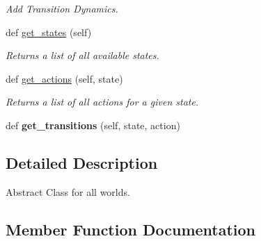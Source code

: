 \begin{DoxyCompactItemize}
\begin{DoxyCompactList}\small\item\em Add Transition Dynamics. \end{DoxyCompactList}\item 
\mbox{\label{classsrc_1_1worlds_1_1abstract__world_1_1_abstract_world_a1c5c774e258d31c703dc7a95280a686d}} 
def \hyperlink{classsrc_1_1worlds_1_1abstract__world_1_1_abstract_world_a1c5c774e258d31c703dc7a95280a686d}{get\+\_\+states} (self)
\begin{DoxyCompactList}\small\item\em Returns a list of all available states. \end{DoxyCompactList}\item 
def \hyperlink{classsrc_1_1worlds_1_1abstract__world_1_1_abstract_world_a177196a17a32460d8076eaffa643646b}{get\+\_\+actions} (self, state)
\begin{DoxyCompactList}\small\item\em Returns a list of all actions for a given state. \end{DoxyCompactList}\item 
\mbox{\label{classsrc_1_1worlds_1_1abstract__world_1_1_abstract_world_ac8e4bb5e8651de5a1c7359f166741fdb}} 
def {\bfseries get\+\_\+transitions} (self, state, action)
\end{DoxyCompactItemize}


\subsection{Detailed Description}
Abstract Class for all worlds. 

\subsection{Member Function Documentation}
\mbox{\label{classsrc_1_1worlds_1_1abstract__world_1_1_abstract_world_add68c02b3b8a3f0c011c0a63f40febb3}} 
